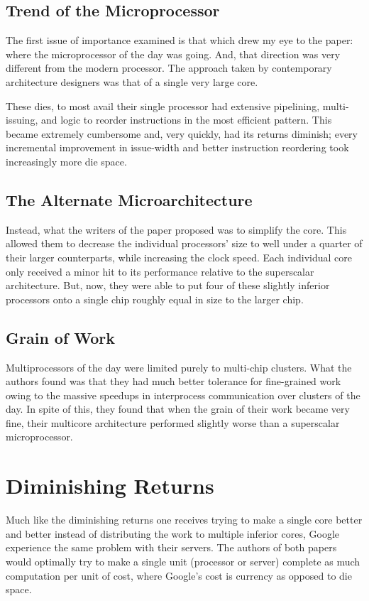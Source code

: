\documentclass[12pt, twocolumn]{article}
\begin{document}
\subsection{Trend of the Microprocessor}
The first issue of importance examined is that which drew my eye to the paper:
where the microprocessor of the day was going. And, that direction was very
different from the modern processor. The approach taken by contemporary
architecture designers was that of a single very large core. 

These dies, to most avail their single processor had extensive pipelining, 
multi-issuing, and logic to reorder instructions in the most efficient pattern. 
This became extremely cumbersome and, very quickly, had its returns diminish; 
every incremental improvement in issue-width and better instruction reordering
took increasingly more die space.
\subsection{The Alternate Microarchitecture}
Instead, what the writers of the paper proposed was to simplify the core. This
allowed them to decrease the individual processors' size to well under a quarter
of their larger counterparts, while increasing the clock speed. Each individual
core only received a minor hit to its performance relative to the superscalar
architecture. But, now, they were able to put four of these slightly inferior
processors onto a single chip roughly equal in size to the larger chip.

\subsection{Grain of Work}
Multiprocessors of the day were limited purely to multi-chip clusters. What the
authors found was that they had much better tolerance for fine-grained work
owing to the massive speedups in interprocess communication over clusters of
the day. In spite of this, they found that when the grain of their work became
very fine, their multicore architecture performed slightly worse than a
superscalar microprocessor.
\section{Diminishing Returns}
Much like the diminishing returns one receives trying to make a single core
better and better instead of distributing the work to multiple inferior cores,
Google experience the same problem with their servers. The authors of both
papers would optimally try to make a single unit (processor or server) complete
as much computation per unit of cost, where Google's cost is currency as opposed
to die space.
\end{document}
